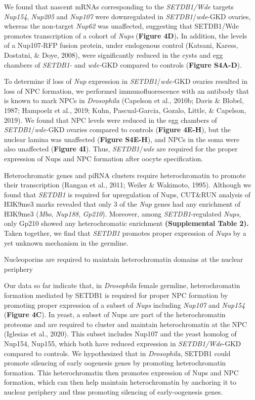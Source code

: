\documentclass[12pt,oneside]{reedthesis}
\begin{document}
We found that nascent mRNAs corresponding to the \emph{SETDB1/Wde} targets
\emph{Nup154}, \emph{Nup205} and \emph{Nup107} were downregulated in \emph{SETDB1}/\emph{wde}-GKD
ovaries, whereas the non-target \emph{Nup62} was unaffected, suggesting that
SETDB1/Wde promotes transcription of a cohort of \emph{Nups} (\textbf{Figure
4D})\textbf{.} In addition, the levels of a Nup107-RFP fusion protein, under
endogenous control (Katsani, Karess, Dostatni, \& Doye, 2008), were
significantly reduced in the cysts and egg chambers of \emph{SETDB1-} and
\emph{wde-}GKD compared to controls (\textbf{Figure S4A-D}).

To determine if loss of \emph{Nup} expression in \emph{SETDB1}/\emph{wde-}GKD ovaries
resulted in loss of NPC formation, we performed immunofluorescence with
an antibody that is known to mark NPCs in \emph{Drosophila}
(Capelson et al., 2010b; Davis \& Blobel, 1987; Hampoelz et al., 2019; Kuhn, Pascual-Garcia, Gozalo, Little, \& Capelson, 2019). We found that NPC levels were
reduced in the egg chambers of \emph{SETDB1}/\emph{wde-}GKD ovaries compared to
controls (\textbf{Figure 4E-H}), but the nuclear lamina was unaffected
(\textbf{Figure S4E-H}), and NPCs in the soma were also unaffected (\textbf{Figure
4I}). Thus, \emph{SETDB1}/\emph{wde} are required for the proper expression of
Nups and NPC formation after oocyte specification.

Heterochromatic genes and piRNA clusters require heterochromatin to
promote their transcription (Rangan et al., 2011; Weiler \& Wakimoto, 1995). Although we found that
\emph{SETDB1} is required for upregulation of Nups, CUT\&RUN analysis of
H3K9me3 marks revealed that only 3 of the \emph{Nup} genes had any enrichment
of H3K9me3 (\emph{Mbo}, \emph{Nup188}, \emph{Gp210}). Moreover, among
\emph{SETDB1}-regulated \emph{Nups}, only Gp210 showed any heterochromatic
enrichment \textbf{(Supplemental Table 2).} Taken together, we find that
\emph{SETDB1} promotes proper expression of \emph{Nups} by a yet unknown mechanism
in the germline.

Nucleoporins are required to maintain heterochromatin domains at the nuclear periphery

Our data so far indicate that, in \emph{Drosophila} female germline,
heterochromatin formation mediated by SETDB1 is required for proper NPC
formation by promoting proper expression of a subset of \emph{Nups} including
\emph{Nup107} and \emph{Nup154} (\textbf{Figure 4C}). In yeast, a subset of Nups are
part of the heterochromatin proteome and are required to cluster and
maintain heterochromatin at the NPC
(Iglesias et al., 2020). This subset includes Nup107
and the yeast homolog of Nup154, Nup155, which both have reduced
expression in \emph{SETDB1/Wde}-GKD compared to controls. We hypothesized
that in \emph{Drosophila,} SETDB1 could promote silencing of early oogenesis
genes by promoting heterochromatin formation. This heterochromatin then
promotes expression of Nups and NPC formation, which can then help
maintain heterochromatin by anchoring it to nuclear periphery and thus
promoting silencing of early-oogenesis genes.
\end{document}
